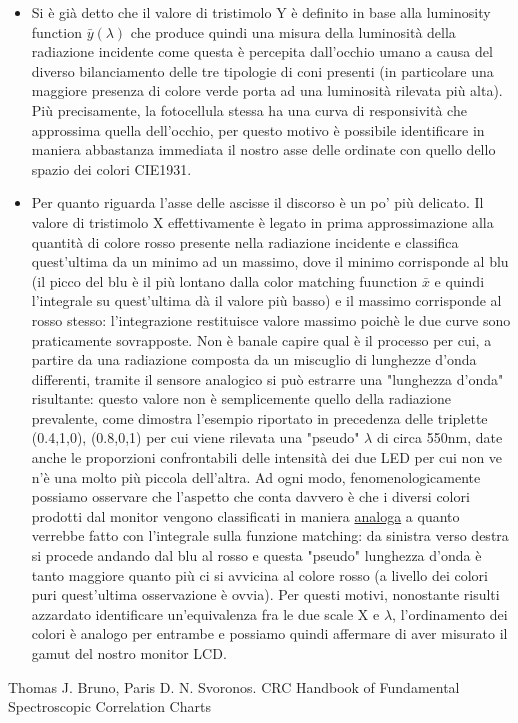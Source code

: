 \documentclass[10pt,letterpaper]{article}
\begin{document}
\begin{itemize}
\item Si è già detto che il valore di tristimolo Y è definito in base alla luminosity function $\bar{y}(\lambda)$ che produce quindi una misura della luminosità della radiazione incidente come questa è percepita dall'occhio umano a causa del diverso bilanciamento delle tre tipologie di coni presenti (in particolare una maggiore presenza di colore verde porta ad una luminosità rilevata più alta). Più precisamente, la fotocellula stessa ha una curva di responsività che approssima quella dell'occhio, per questo motivo è possibile identificare in maniera abbastanza immediata il nostro asse delle ordinate con quello dello spazio dei colori CIE1931.

\item Per quanto riguarda l'asse delle ascisse il discorso è un po' più delicato. Il valore di tristimolo X effettivamente è legato in prima approssimazione alla quantità di colore rosso presente nella radiazione incidente e classifica quest'ultima da un minimo ad un massimo, dove il minimo corrisponde al blu (il picco del blu è il più lontano dalla color matching fuunction $\bar{x}$ e quindi l'integrale su quest'ultima dà il valore più basso) e il massimo corrisponde al rosso stesso: l'integrazione restituisce valore massimo poichè le due curve sono praticamente sovrapposte. Non è banale capire qual è il processo per cui, a partire da una radiazione composta da un miscuglio di lunghezze d'onda differenti, tramite il sensore analogico si può estrarre una "lunghezza d'onda" risultante: questo valore non è semplicemente quello della radiazione prevalente, come dimostra l'esempio riportato in precedenza delle triplette (0.4,1,0), (0.8,0,1) per cui viene rilevata una "pseudo" $\lambda$ di circa 550nm, date anche le proporzioni confrontabili delle intensità dei due LED per cui non ve n'è una molto più piccola dell'altra. Ad ogni modo, fenomenologicamente possiamo osservare che l'aspetto che conta davvero è che i diversi colori prodotti dal monitor vengono classificati in maniera \underline{analoga} a quanto verrebbe fatto con l'integrale sulla funzione matching: da sinistra verso destra si procede andando dal blu al rosso e questa "pseudo" lunghezza d'onda è tanto maggiore quanto più ci si avvicina al colore rosso (a livello dei colori puri quest'ultima osservazione è ovvia). Per questi motivi, nonostante risulti azzardato identificare un'equivalenza fra le due scale X e $\lambda$, l'ordinamento dei colori è analogo per entrambe e possiamo quindi affermare di aver misurato il gamut del nostro monitor LCD.
\end{itemize}

\begin{thebibliography}{10}

Thomas J. Bruno, Paris D. N. Svoronos. CRC Handbook of Fundamental Spectroscopic Correlation Charts

\end{thebibliography}
\end{document}
